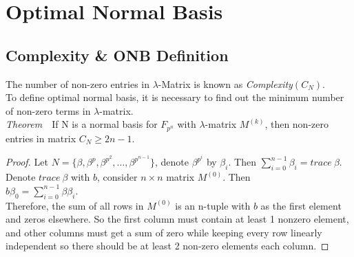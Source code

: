 \documentclass[conference]{IEEEtran}
\begin{document}

\section{Optimal Normal Basis}
	\subsection{Complexity \& ONB Definition}
The number of non-zero entries in $\lambda$-Matrix is known as  \emph{Complexity$(C_N)$}. \\
To define optimal normal basis, it is necessary to find out the minimum number
of non-zero terms in $\lambda$-matrix.\\
\textit{Theorem}\ \ If N is a normal basis for $F_{p^n}$ with $\lambda$-matrix $M^{(k)}$, then non-zero entries in 
matrix $C_N\geq 2n-1$.\\
\begin{proof}
Let $N = \{\beta, \beta^p, \beta^{p^2},\dots, \beta^{p^{n-1}}\}$, denote $\beta^{p^i}$ by $\beta_i$. 
Then $\sum_{i=0}^{n-1} \beta_i = trace\ \beta$. \\
Denote $trace\ \beta$ with $b$, consider $n\times n$ matrix $M^{(0)}$. Then\\
$b\beta_0 = \sum_{i=0}^{n-1} \beta \beta_i$.\\
Therefore, the sum of all rows in $M^{(0)}$ is an n-tuple with $b$ as the first element and zeros elsewhere.
So the first column must contain at least 1 nonzero element, and other columns must get a sum of zero 
while keeping every row linearly independent so there should be at least 2 non-zero elements each column.
\end{proof}
\end{document}
